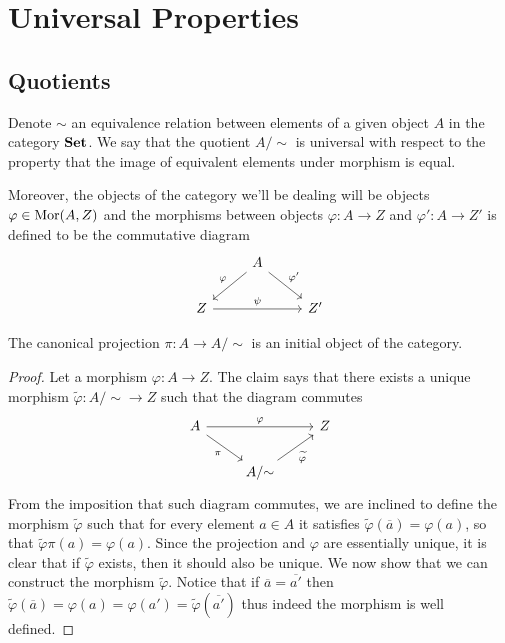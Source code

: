 \section{Universal Properties}

\subsection{Quotients}

Denote \(\sim\) an equivalence relation between elements of a given object
\(A\) in the category \({\textbf{Set}}\). We say that the quotient \(A/{\sim}\) is
universal with respect to the property that the image of equivalent elements
under morphism is equal.

Moreover, the objects of the category we'll be dealing will be objects
\(\varphi \in \operatorname{Mor}(A, Z)\) and the morphisms between objects \(\varphi : A \to
Z\) and \(\varphi' : A \to Z'\) is defined to be the commutative diagram
\[
\begin{tikzcd}
  &A \ar[dl, swap, "\varphi"] \ar[dr, "\varphi'"] & \\
Z \ar[rr, "\psi"] & &Z'
\end{tikzcd}
\]

\begin{proposition}
The canonical projection \(\pi : A \to A/{\sim}\) is an initial object of the
category.
\end{proposition}

\begin{proof}
Let a morphism \(\varphi: A \to Z\). The claim says that there exists a
unique morphism \(\tilde{\varphi} : A/{\sim} \to Z\) such that the diagram
commutes
\[
  \begin{tikzcd}
    A \ar[rr, "\varphi"] \ar[dr, swap, "\pi"]
      &
        & Z \\
      & A/{\sim} \ar[ur, swap, "\widetilde \varphi"]
  \end{tikzcd}
\]
From the imposition that such diagram commutes, we are inclined to define the
morphism \(\tilde\varphi\) such that for every element \(a \in A\) it
satisfies \(\tilde\varphi(\overline{a}) = \varphi(a)\), so that
\(\tilde\varphi  \pi (a) = \varphi(a)\). Since the projection and
\(\varphi\) are essentially unique, it is clear that if \(\tilde\varphi\)
exists, then it should also be unique. We now show that we can construct the
morphism \(\tilde\varphi\). Notice that if \(\overline{a} = \overline{a'}\)
then \(\tilde\varphi(\overline{a}) = \varphi(a)= \varphi(a') =
\tilde\varphi(\overline{a'})\) thus indeed the morphism is well defined.
\end{proof}

